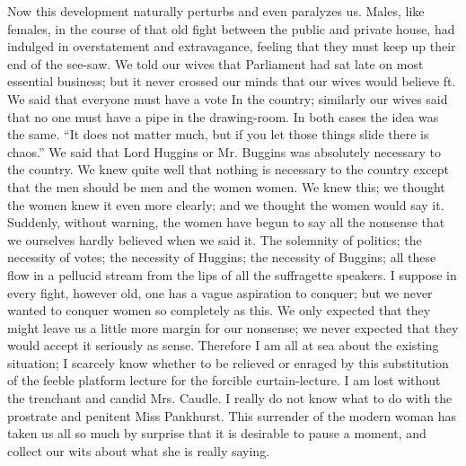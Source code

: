 \documentclass{book}
\begin{document}
Now this development naturally perturbs and even paralyzes us. Males, like females, in the course of that old fight between the public and private house, had indulged in overstatement and extravagance, feeling that they must keep up their end of the see-saw. We told our wives that Parliament had sat late on most essential business; but it never crossed our minds that our wives would believe ft. We said that everyone must have a vote In the country; similarly our wives said that no one must have a pipe in the drawing-room. In both cases the idea was the same. “It does not matter much, but if you let those things slide there is chaos.” We said that Lord Huggins or Mr. Buggins was absolutely necessary to the country. We knew quite well that nothing is necessary to the country except that the men should be men and the women women. We knew this; we thought the women knew it even more clearly; and we thought the women would say it. Suddenly, without warning, the women have begun to say all the nonsense that we ourselves hardly believed when we said it. The solemnity of politics; the necessity of votes; the necessity of Huggins; the necessity of Buggins; all these flow in a pellucid stream from the lips of all the suffragette speakers. I suppose in every fight, however old, one has a vague aspiration to conquer; but we never wanted to conquer women so completely as this. We only expected that they might leave us a little more margin for our nonsense; we never expected that they would accept it seriously as sense. Therefore I am all at sea about the existing situation; I scarcely know whether to be relieved or enraged by this substitution of the feeble platform lecture for the forcible curtain-lecture. I am lost without the trenchant and candid Mrs. Caudle. I really do not know what to do with the prostrate and penitent Miss Pankhurst. This surrender of the modern woman has taken us all so much by surprise that it is desirable to pause a moment, and collect our wits about what she is really saying.
\end{document}
